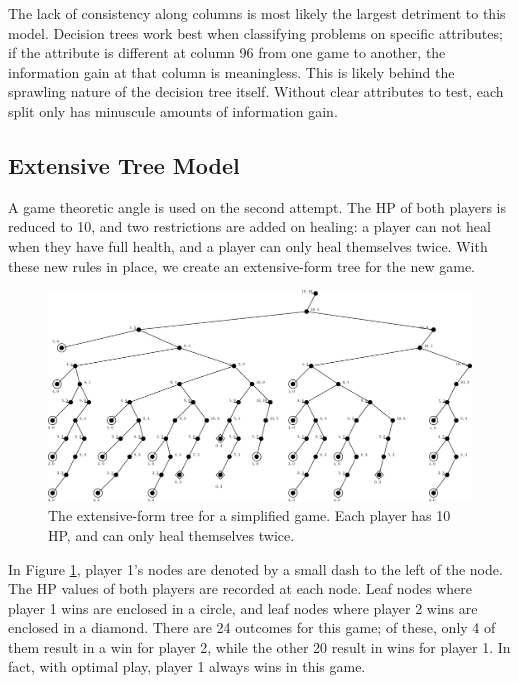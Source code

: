 The lack of consistency along columns is most likely the largest detriment to this model. Decision trees work best when classifying problems on specific attributes; if the attribute is different at column 96 from one game to another, the information gain at that column is meaningless. This is likely behind the sprawling nature of the decision tree itself. Without clear attributes to test, each split only has minuscule amounts of information gain.

\subsection{Extensive Tree Model}
A game theoretic angle is used on the second attempt. The HP of both players is reduced to 10, and two restrictions are added on healing: a player can not heal when they have full health, and a player can only heal themselves twice. With these new rules in place, we create an extensive-form tree for the new game.\\

\begin{figure}[H]
  \centering
  \includegraphics[width=15cm]{figures/GameTree.png}
  \caption{The extensive-form tree for a simplified game. Each player has 10 HP, and can only heal themselves twice.}
  \label{fig:gameTree}
\end{figure}

In Figure \ref{fig:gameTree}, player 1's nodes are denoted by a small dash to the left of the node. The HP values of both players are recorded at each node. Leaf nodes where player 1 wins are enclosed in a circle, and leaf nodes where player 2 wins are enclosed in a diamond. There are 24 outcomes for this game; of these, only 4 of them result in a win for player 2, while the other 20 result in wins for player 1. In fact, with optimal play, player 1 always wins in this game.\\

